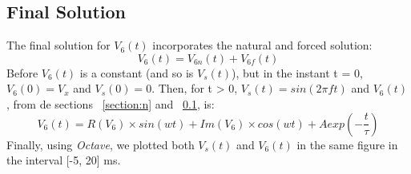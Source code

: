 \subsection{Final Solution}
The final solution for $V_6(t)$ incorporates the natural and forced solution:
\begin{equation}
V_6(t) = V_{6n}(t) + V_{6f}(t)
\end{equation}
Before $V_6(t)$ is a constant (and so is $V_s(t)$), but in the instant t = 0, $V_6(0)=V_x$ and $V_s(0) = 0$. Then, for t > 0, $V_s(t) = sin(2\pi ft)$ and $V_6(t)$, from de sections ~\ref{section:n} and ~\ref{}, is:
\begin{equation}
V_6(t) = R(V_6)\times sin(wt)+Im(V_6)\times cos(wt)+Aexp(-\frac{t}{\tau})
\end{equation}
Finally, using \textit{Octave}, we plotted both $V_s(t)$ and $V_6(t)$ in the same figure in the interval [-5, 20] ms.
